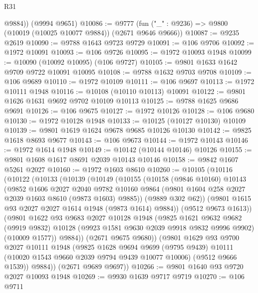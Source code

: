 \begin{lexlean}{R31}
\begin{coremodule}
        @9884))
    (@9994 @9651)
@10086 := @9777 (fun ("_" : @9236) => @9800 (@10019 (@10025 @10077 @9884)) (@2671 @9646 @9666))
@10087 := @9235 @2619
@10090 := @9788 @1643 @9723 @9729
@10091 := @106 @9706
@10092 := @1972 @10091
@10093 := @106 @9726
@10095 := @1972 @10093 @1948
@10099 := @10090 (@10092 @10095) (@106 @9727)
@10105 := @9801 @1633 @1642 @9709 @9722 @10091 @10095
@10108 := @9788 @1632 @9703 @9708
@10109 := @106 @9689
@10110 := @1972 @10109
@10111 := @106 @9697
@10113 := @1972 @10111 @1948
@10116 := @10108 (@10110 @10113) @10091
@10122 := @9801 @1626 @1631 @9692 @9702 @10109 @10113
@10125 := @9788 @1625 @9686 @9691
@10126 := @106 @9675
@10127 := @1972 @10126
@10128 := @106 @9680
@10130 := @1972 @10128 @1948
@10133 := @10125 (@10127 @10130) @10109
@10139 := @9801 @1619 @1624 @9678 @9685 @10126 @10130
@10142 := @9825 @1618 @8693 @9677
@10143 := @106 @9673
@10144 := @1972 @10143
@10146 := @1972 @1614 @1948
@10149 := @10142 (@10144 @10146) @10126
@10155 := @9801 @1608 @1617 @8691 @2039 @10143 @10146
@10158 := @9842 @1607 @5261 @2027
@10160 := @1972 @1603 @8610
@10260 := @10105
    (@10116
      (@10122
        (@10133
          (@10139
            (@10149
              (@10155
                (@10158
                  (@9846 @10160)
                  @10143
                  (@9852
                    @1606
                    @2027
                    @2040
                    @9782
                    @10160
                    @9864
                    (@9801 @1604 @258 @2027 @2039 @1603 @8610 (@9873 @1603) @9885))
                  (@9889 @302 @62))
                (@9801 @1615 @93 @2027 @2027 @1614 @1948 (@9873 @1614) @9884))
              (@9512 @9673 @1613))
            (@9801
              @1622
              @93
              @9683
              @2027
              @10128
              @1948
              (@9825
                @1621
                @9632
                @9682
                (@9919 @9832)
                @10128
                (@9923 @1581 @9630 @2039 @9918 @9832 @9996 @9902)
                (@10009 @1577))
              @9884))
          (@2671 @9675 @9680))
        (@9801
          @1629
          @93
          @9700
          @2027
          @10111
          @1948
          (@9825
            @1628
            @9694
            @9699
            (@9795 @9439)
            @10111
            (@10020 @1543 @9660 @2039 @9794 @9439 @10077 @10006)
            (@9512 @9666 @1539))
          @9884))
      (@2671 @9689 @9697))
@10266 := @9801 @1640 @93 @9720 @2027 @10093 @1948
@10269 := @9930 @1639 @9717 @9719
@10270 := @106 @9711

\end{coremodule}
\end{lexlean}

